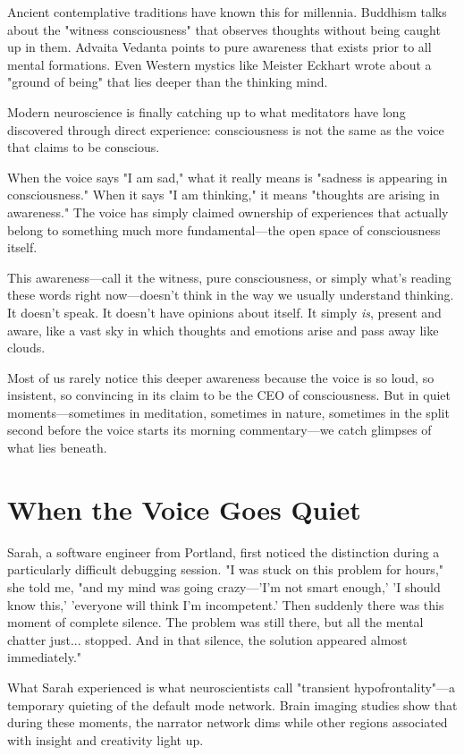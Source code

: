 \documentclass[10pt,twocolumn]{article}
\begin{document}
Ancient contemplative traditions have known this for millennia. Buddhism talks about the "witness consciousness" that observes thoughts without being caught up in them. Advaita Vedanta points to pure awareness that exists prior to all mental formations. Even Western mystics like Meister Eckhart wrote about a "ground of being" that lies deeper than the thinking mind.

Modern neuroscience is finally catching up to what meditators have long discovered through direct experience: consciousness is not the same as the voice that claims to be conscious.

When the voice says "I am sad," what it really means is "sadness is appearing in consciousness." When it says "I am thinking," it means "thoughts are arising in awareness." The voice has simply claimed ownership of experiences that actually belong to something much more fundamental—the open space of consciousness itself.

This awareness—call it the witness, pure consciousness, or simply what's reading these words right now—doesn't think in the way we usually understand thinking. It doesn't speak. It doesn't have opinions about itself. It simply \textit{is}, present and aware, like a vast sky in which thoughts and emotions arise and pass away like clouds.

Most of us rarely notice this deeper awareness because the voice is so loud, so insistent, so convincing in its claim to be the CEO of consciousness. But in quiet moments—sometimes in meditation, sometimes in nature, sometimes in the split second before the voice starts its morning commentary—we catch glimpses of what lies beneath.

\section{When the Voice Goes Quiet}

Sarah, a software engineer from Portland, first noticed the distinction during a particularly difficult debugging session. "I was stuck on this problem for hours," she told me, "and my mind was going crazy—'I'm not smart enough,' 'I should know this,' 'everyone will think I'm incompetent.' Then suddenly there was this moment of complete silence. The problem was still there, but all the mental chatter just... stopped. And in that silence, the solution appeared almost immediately."

What Sarah experienced is what neuroscientists call "transient hypofrontality"—a temporary quieting of the default mode network. Brain imaging studies show that during these moments, the narrator network dims while other regions associated with insight and creativity light up.
\end{document}
